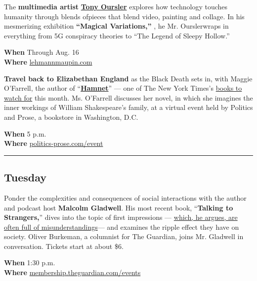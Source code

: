 The \textbf{multimedia artist}
\textbf{\href{https://www.nytimes3xbfgragh.onion/2015/06/09/t-magazine/tony-oursler-home-studio-tour.html}{Tony
Oursler}} explores how technology touches humanity through blends
ofpieces that blend video, painting and collage. In his mesmerizing
exhibition \textbf{``Magical Variations,''} , he Mr. Ourslerwraps in
everything from 5G conspiracy theories to ``The Legend of Sleepy
Hollow.''

\textbf{When} Through Aug. 16\\
\textbf{Where}
\href{https://www.lehmannmaupin.com/viewing-room/tony-oursler}{lehmannmaupin.com}

\textbf{Travel back to Elizabethan England} as the Black Death sets in,
with Maggie O'Farrell, the author of
``\textbf{\href{https://www.nytimes3xbfgragh.onion/2020/07/17/books/review/hamnet-maggie-ofarrell.html}{Hamnet}}''
--- one of The New York Times's
\href{https://www.nytimes3xbfgragh.onion/2020/06/24/books/new-july-books.html}{books
to watch for} this month. Ms. O'Farrell discusses her novel, in which
she imagines the inner workings of William Shakespeare's family, at a
virtual event held by Politics and Prose, a bookstore in Washington,
D.C.

\textbf{When} 5 p.m.\\
\textbf{Where}
\href{https://www.politics-prose.com/event/book/pp-live-maggie-ofarrell-hamnet-in-conversation-amity-gaige}{politics-prose.com/event}

\begin{center}\rule{0.5\linewidth}{\linethickness}\end{center}

\hypertarget{tuesday}{%
\subsection{Tuesday}\label{tuesday}}

Ponder the complexities and consequences of social interactions with the
author and podcast host \textbf{Malcolm Gladwell}. His most recent book,
``\textbf{Talking to Strangers,}'' dives into the topic of first
impressions ---
\href{https://www.nytimes3xbfgragh.onion/2019/08/30/business/malcolm-gladwell-talking-to-strangers.html}{which,
he argues, are often full of misunderstandings}--- and examines the
ripple effect they have on society. Oliver Burkeman, a columnist for The
Guardian, joins Mr. Gladwell in conversation. Tickets start at about
\$6.

\textbf{When} 1:30 p.m.\\
\textbf{Where}
\href{https://membership.theguardian.com/events}{membership.theguardian.com/events}

